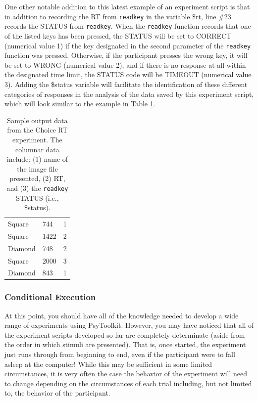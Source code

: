 One other notable addition to this latest example of an experiment script is that in addition to recording the RT from \texttt{readkey} in the variable \$rt, line \#23 records the STATUS from \texttt{readkey}.  When the \texttt{readkey} function records that one of the listed keys has been pressed, the STATUS will be set to CORRECT (numerical value 1) if the key designated in the second parameter of the \texttt{readkey} function was pressed. Otherwise, if the participant presses the wrong key, it will be set to WRONG (numerical value 2), and if there is no response at all within the designated time limit, the STATUS code will be TIMEOUT (numerical value 3).  Adding the \$status variable will facilitate the identification of these different categories of responses in the analysis of the data saved by this experiment script, which will look similar to the example in Table \ref{tab:choicedata}.
\begin{center}
\begin{table}[h]
\begin{tabular}{ l l l}
    Square & 744 & 1\\
    Square & 1422 & 2\\
    Diamond & 748 & 2\\
    Square & 2000 & 3\\
    Diamond & 843 & 1\\
\end{tabular}
\caption{\label{tab:choicedata}Sample output data from the Choice RT experiment. The columnar data include: (1) name of the image file presented, (2) RT, and (3) the \texttt{readkey} STATUS (i.e., \$status).}
\end{table}
\end{center}

\subsubsection{Conditional Execution}
At this point, you should have all of the knowledge needed to develop a wide range of experiments using PsyToolkit.  However, you may have noticed that all of the experiment scripts developed so far are completely determinate (aside from the order in which stimuli are presented).  That is, once started, the experiment just runs through from beginning to end, even if the participant were to fall asleep at the computer!  While this may be sufficient in some limited circumstances, it is very often the case the behavior of the experiment will need to change depending on the circumstances of each trial including, but not limited to, the behavior of the participant.

